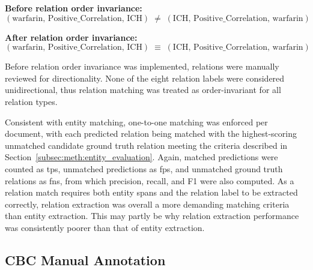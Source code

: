 \vspace{0.75em}
\newcommand{\triple}[3]{(\text{#1},\, \text{#2},\, \text{#3})}

\noindent\textbf{Before relation order invariance:}
\vspace{0.25em}
\[
\triple{warfarin}{Positive\_Correlation}{ICH}
\;\neq\;
\triple{ICH}{Positive\_Correlation}{warfarin}
\]

\vspace{0.75em}

\noindent\textbf{After relation order invariance:}
\vspace{0.25em}
\[
\triple{warfarin}{Positive\_Correlation}{ICH}
\;\equiv\;
\triple{ICH}{Positive\_Correlation}{warfarin}
\]

\noindent Before relation order invariance was implemented, relations were manually reviewed for directionality. None of the eight relation labels were considered unidirectional, thus relation matching was treated as order-invariant for all relation types.

Consistent with entity matching, one-to-one matching was enforced per document, with each predicted relation being matched with the highest-scoring unmatched candidate ground truth relation meeting the criteria described in Section~\ref{subsec:meth:entity_evaluation}. Again, matched predictions were counted as \glspl{tp}, unmatched predictions as \glspl{fp}, and unmatched ground truth relations as \glspl{fn}, from which precision, recall, and F1 were also computed. As a relation match requires both entity spans and the relation label to be extracted correctly, relation extraction was overall a more demanding matching criteria than entity extraction. This may partly be why relation extraction performance was consistently poorer than that of entity extraction.

\subsection{CBC Manual Annotation}
\label{subsec:meth:cbc_manual_annotation}

